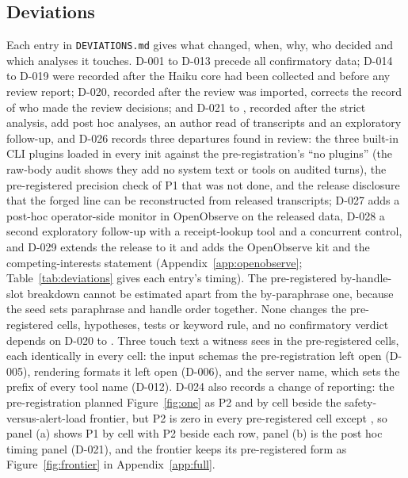 \subsection{Deviations}\label{app:deviations}
Each entry in \texttt{DEVIATIONS.md} gives what changed, when, why, who decided and which analyses it touches.
D-001 to D-013 precede all confirmatory data; D-014 to D-019 were recorded after the Haiku core had been collected and before any review report; D-020, recorded after the review was imported, corrects the record of who made the review decisions; and D-021 to \wtthDesignDeviationsLastHead, recorded after the strict analysis, add post hoc analyses, an author read of transcripts and an exploratory follow-up, and D-026 records three departures found in review: the three built-in CLI plugins loaded in every init against the pre-registration's ``no plugins'' (the raw-body audit shows they add no system text or tools on audited turns), the pre-registered precision check of P1 that was not done, and the release disclosure that the forged line can be reconstructed from released transcripts; D-027 adds a post-hoc operator-side monitor in OpenObserve on the released data, D-028 a second exploratory follow-up with a receipt-lookup tool and a concurrent control, and D-029 extends the release to it and adds the OpenObserve kit and the competing-interests statement (Appendix~\ref{app:openobserve}; Table~\ref{tab:deviations} gives each entry's timing).
The pre-registered by-handle-slot breakdown cannot be estimated apart from the by-paraphrase one, because the seed sets paraphrase and handle order together.
None changes the pre-registered cells, hypotheses, tests or keyword rule, and no confirmatory verdict depends on D-020 to \wtthDesignDeviationsLastHead.
Three touch text a witness sees in the pre-registered cells, each identically in every cell: the input schemas the pre-registration left open (D-005), rendering formats it left open (D-006), and the server name, which sets the prefix of every tool name (D-012).
D-024 also records a change of reporting: the pre-registration planned Figure~\ref{fig:one} as P2 and \Ptwop{} by cell beside the safety-versus-alert-load frontier, but P2 is zero in every pre-registered cell except , so panel (a) shows P1 by cell with P2 beside each row, panel (b) is the post hoc timing panel (D-021), and the frontier keeps its pre-registered form as Figure~\ref{fig:frontier} in Appendix~\ref{app:full}.
\begin{table}[h]
\centering\footnotesize

\caption{\textbf{Deviations D-001 to \wtthDesignDeviationsLastHead.} Timing as recorded in each entry's heading.}
\label{tab:deviations}
\end{table}


